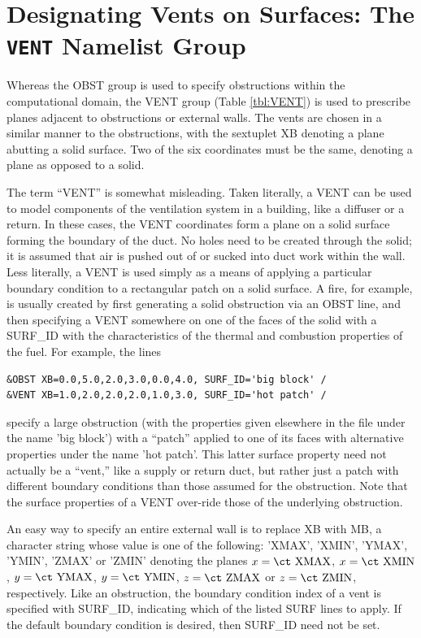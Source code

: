 \documentclass[11pt]{book}
\begin{document}
\section{Designating Vents on Surfaces: The \texorpdfstring{{\tt VENT}}{VENT} Namelist Group}
\label{info:VENT}

Whereas the {\ct OBST} group is used to specify obstructions within the
computational domain, the {\ct VENT} group (Table \ref{tbl:VENT}) is used to prescribe planes
adjacent to obstructions or external walls. The vents are chosen in a
similar manner to the obstructions, with the sextuplet {\ct XB}
denoting a plane abutting a solid surface. Two of the six coordinates must
be the same, denoting a plane as opposed to a solid.

The term ``{\ct VENT}'' is somewhat misleading. Taken literally, a
{\ct VENT} can be used to model components of the ventilation system in
a building, like a diffuser or a return.
In these cases, the {\ct VENT} coordinates form a plane on a
solid surface forming the boundary of the duct.
No holes need to be created through the solid; it is
assumed that air is pushed out of or sucked into duct work within the
wall. Less literally, a {\ct VENT} is used simply as a means of applying
a particular boundary condition to a rectangular patch on a solid surface.
A fire, for example, is usually created by first generating a solid
obstruction via an {\ct OBST} line, and then specifying a {\ct VENT}
somewhere on one of the faces of the solid with a {\ct SURF\_ID}
with the characteristics of the thermal and combustion properties of the fuel.
For example, the lines

\footnotesize
\begin{verbatim}
&OBST XB=0.0,5.0,2.0,3.0,0.0,4.0, SURF_ID='big block' /
&VENT XB=1.0,2.0,2.0,2.0,1.0,3.0, SURF_ID='hot patch' /
\end{verbatim} \normalsize

\noindent
specify a large obstruction (with the properties given elsewhere in the file under the name {\ct 'big block'}) with
a ``patch'' applied to one of its faces with alternative properties under the name {\ct 'hot patch'}. This latter
surface property need not actually be a ``vent,'' like a supply or return duct, but rather just a patch with different boundary
conditions than those assumed for the obstruction. Note that the surface properties of a {\ct VENT} over-ride those of the
underlying obstruction.

An easy way to specify an entire external wall is to replace {\ct XB} with
{\ct MB}, a character string whose value is one of the following:
{\ct 'XMAX'}, {\ct 'XMIN'}, {\ct 'YMAX'}, {\ct 'YMIN'}, {\ct 'ZMAX'} or
{\ct 'ZMIN'} denoting the planes $x=\hbox{\ct XMAX}$, $x=\hbox{\ct XMIN}$,
$y=\hbox{\ct YMAX}$, $y=\hbox{\ct YMIN}$, $z=\hbox{\ct ZMAX}$
or $z=\hbox{\ct ZMIN}$, respectively.
Like an obstruction, the boundary condition index of a vent is specified
with {\ct SURF\_ID}, indicating which of the listed {\ct SURF} lines to
apply. If the default boundary condition is desired, then {\ct SURF\_ID} need not be set.
\end{document}

